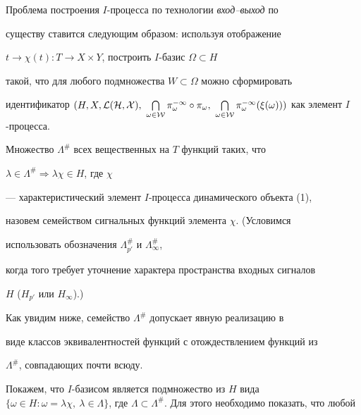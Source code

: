 


Проблема построения $I$-процесса по технологии {\it вход--выход} по 


существу ставится \cite{1} следующим образом: используя отображение 


$t\to\chi(t):T\to X\times Y$, построить $I$-базис $\Omega\subset H$ 


такой, что для любого подмножества $W\subset \Omega$ можно сформировать 


идентификатор $(H,X,\cal L(H,X),\ \bigcap\limits_{\omega\in 


W}\pi^{-1}_\omega\circ\pi_\omega,\ \bigcap\limits_{\omega\in 


W}\pi^{-1}_\omega(\xi(\omega)))$ как элемент $I$-процесса. 


 


\begin{defn} 


Множество $\Lambda^{\#}$ всех вещественных на $T$ функций таких, что 


$\lambda\in\Lambda^{\#}\Rightarrow\lambda\chi\in H$, где $\chi$ 


--- характеристический элемент $I$-процесса динамического объекта (1), 


назовем семейством сигнальных функций элемента $\chi$. (Условимся 


использовать обозначения $\Lambda^{\#}_{p'}$ и $\Lambda^{\#}_\infty$, 


когда того требует уточнение характера пространства входных сигналов 


$H$ ($H_{p'}$ или $H_\infty$).) 


\end{defn} 


 


Как увидим ниже, семейство $\Lambda^{\#}$ допускает явную реализацию в 


виде классов эквивалентностей функций с отождествлением функций из 


$\Lambda^{\#}$, совпадающих почти всюду. 


 


Покажем, что $I$-базисом является подмножество из $H$ вида $\{\omega\in 


H:\omega=\lambda\chi,\ \lambda\in\Lambda\}$, где $\Lambda\subset 


\Lambda^{\#}$. Для этого необходимо показать, что любой 


